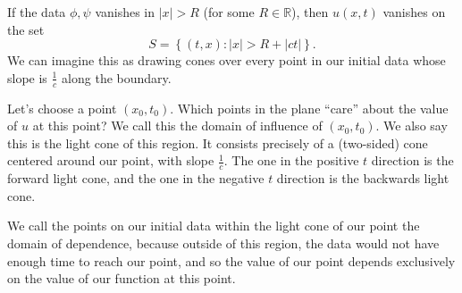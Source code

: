 \begin{remark}	
	If the data \( \phi, \psi \) vanishes in \( |x| > R \) (for some \( R \in \mathbb{R} \)), then \( u(x, t) \) vanishes on the set
	\[ S = \left\{ (t, x) : |x| > R + |ct| \right\}. \]
	We can imagine this as drawing cones over every point in our initial data whose slope is \( \frac{1}{c} \) along the boundary.

	Let's choose a point \( (x_{0}, t_{0}) \). Which points in the plane ``care'' about the value of \( u \) at this point? We call this the domain of influence of \( (x_{0}, t_{0}) \). We also say this is the light cone of this region. It consists precisely of a (two-sided) cone centered around our point, with slope \( \frac{1}{c} \). The one in the positive \( t \) direction is the forward light cone, and the one in the negative \( t \) direction is the backwards light cone.

	We call the points on our initial data within the light cone of our point the domain of dependence, because outside of this region, the data would not have enough time to reach our point, and so the value of our point depends exclusively on the value of our function at this point.
\end{remark}


